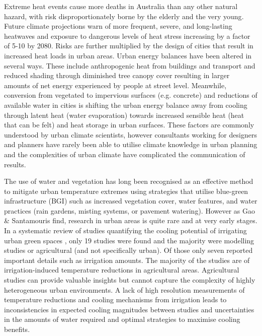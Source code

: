 Extreme heat events cause more deaths in Australia than any other natural hazard\cite{Coates2014}, with risk disproportionately borne by the elderly and the very young\cite{Nicholls2008}. Future climate projections warn of more frequent, severe, and long-lasting heatwaves\cite{IPCC2013a} and exposure to dangerous levels of heat stress increasing by a factor of 5-10 by 2080\cite{Coffel2018}. Risks are further multiplied by the design of cities\cite{Coutts2012,Martilli2020} that result in increased heat loads in urban areas. Urban energy balances have been altered in several ways\cite{Oke1982}. These include anthropogenic heat from buildings and transport and reduced shading through diminished tree canopy cover resulting in larger amounts of net energy experienced by people at street level. Meanwhile, conversion from vegetated to impervious surfaces (e.g. concrete) and reductions of available water in cities is shifting the urban energy balance away from cooling through latent heat (water evaporation) towards increased sensible heat (heat that can be felt) and heat storage in urban surfaces. These factors are commonly understood by urban climate scientists, however consultants working for designers and planners have rarely been able to utilise climate knowledge in urban planning\cite{Elasson2000} and the complexities of urban climate have complicated the communication of results\cite{Oke2006}.

The use of water and vegetation has long been recognised as an effective method \cite{Coutts2012,Bowler2010} to mitigate urban temperature extremes using strategies that utilise blue-green infrastructure (BGI)\cite{Norton2015,Gunawardena2017,Newton2020} such as increased vegetation cover, water features, and water practices (rain gardens, misting systems, or pavement watering). However as Gao \& Santamouris \cite{Gao2019} find, research in urban areas is quite rare and at very early stages. In a systematic review of studies quantifying the cooling potential of irrigating urban green spaces \textbf{\cite{Cheung2021}}, only 19 studies were found and the majority were modelling studies or agricultural (and not specifically urban). Of those only seven reported important details such as irrigation amounts. The majority of the studies are of irrigation-induced temperature reductions in agricultural areas. Agricultural studies can provide valuable insights but cannot capture the complexity of highly heterogeneous urban environments. A lack of high resolution measurements of temperature reductions and cooling mechanisms from irrigation leads to inconsistencies in expected cooling magnitudes between studies and uncertainties in the amounts of water required and optimal strategies to maximise cooling benefits. 

